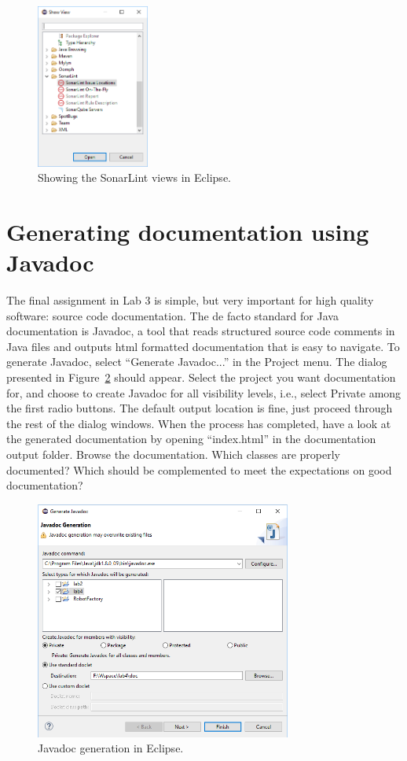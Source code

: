 \documentclass{scrreprt}
\begin{document}
\begin{figure}
\centering
\includegraphics[width=0.33\textwidth]{figures/SonarLint.png}
\caption{Showing the SonarLint views in Eclipse.}
\label{fig:sonarlint}
\end{figure}

\section{Generating documentation using Javadoc}
The final assignment in Lab 3 is simple, but very important for high quality software: source code documentation. The de facto standard for Java documentation is Javadoc, a tool that reads structured source code comments in Java files and outputs html formatted documentation that is easy to navigate. To generate Javadoc, select ``Generate Javadoc...'' in the Project menu. The dialog presented in Figure~\ref{fig:javadoc} should appear. Select the project you want documentation for, and choose to create Javadoc for all visibility levels, i.e., select Private among the first radio buttons. The default output location is fine, just proceed through the rest of the dialog windows. When the process has completed, have a look at the generated documentation by opening ``index.html'' in the documentation output folder. Browse the documentation. Which classes are properly documented? Which should be complemented to meet the expectations on good documentation?

\begin{figure}
\centering
\includegraphics[width=0.75\textwidth]{figures/Javadoc.png}
\caption{Javadoc generation in Eclipse.}
\label{fig:javadoc}
\end{figure}
\end{document}
